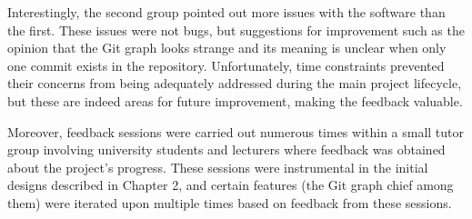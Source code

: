 Interestingly, the second group pointed out more issues with the software than the first. These issues were not bugs, but suggestions for improvement such as the opinion that the Git graph looks strange and its meaning is unclear when only one commit exists in the repository. Unfortunately, time constraints prevented their concerns from being adequately addressed during the main project lifecycle, but these are indeed areas for future improvement, making the feedback valuable.

Moreover, feedback sessions were carried out numerous times within a small tutor group involving university students and lecturers where feedback was obtained about the project's progress. These sessions were instrumental in the initial designs described in Chapter 2, and certain features (the Git graph chief among them) were iterated upon multiple times based on feedback from these sessions.

